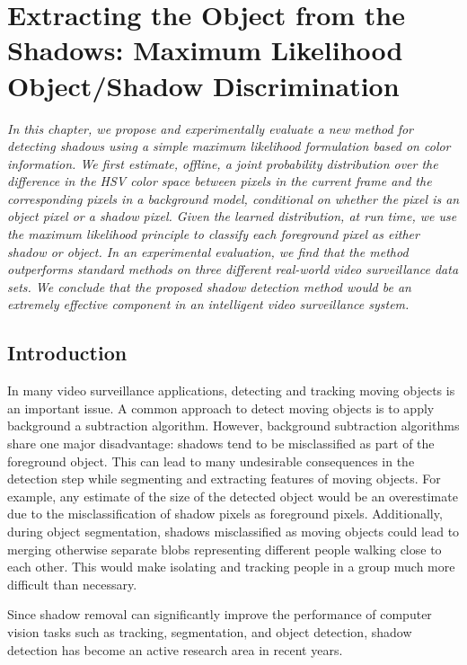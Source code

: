 \setlength{\footskip}{8mm}

\chapter{Extracting the Object from the Shadows: Maximum Likelihood
Object/Shadow Discrimination}
\label{ch:shadow}

\textit{In this chapter, we propose and experimentally evaluate a new
method for detecting shadows using a simple maximum likelihood
formulation based on color information. We first estimate, offline, a
joint probability distribution over the difference in the HSV color
space between pixels in the current frame and the corresponding pixels
in a background model, conditional on whether the pixel is an object
pixel or a shadow pixel.  Given the learned distribution, at run time,
we use the maximum likelihood principle to classify each foreground
pixel as either shadow or object.  In an experimental evaluation, we
find that the method outperforms standard methods on three different
real-world video surveillance data sets.  We conclude that the
proposed shadow detection method would be an extremely effective
component in an intelligent video surveillance system.}

\section{Introduction}

In many video surveillance applications, detecting and tracking moving
objects is an important issue. A \DIFdelbegin {}\DIFdelend common approach to detect moving
objects is to apply background a subtraction algorithm. However,
background subtraction algorithms share one major disadvantage:
shadows tend to be misclassified as part of the foreground
object. This can lead to many undesirable consequences in the
detection step while segmenting and extracting features of moving
objects. For example, any estimate of the size of the detected object
would be an overestimate due to the misclassification of shadow pixels
as foreground pixels. Additionally, during object segmentation,
shadows misclassified as moving objects could lead to merging
otherwise separate blobs representing different people walking close
to each other.  This would make isolating and tracking people in a
group much more difficult than necessary.

Since shadow removal can significantly improve the performance of
computer vision tasks such as tracking, segmentation, and object
detection, shadow detection has become an active research area in
recent years.

